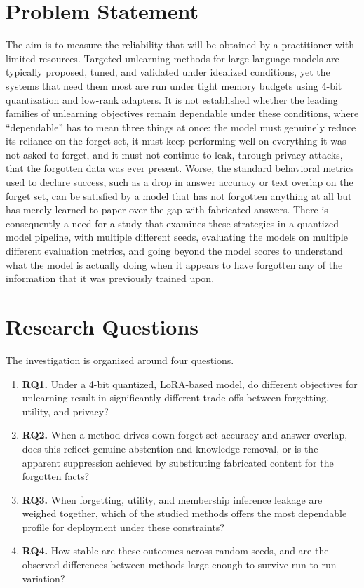 \documentclass[a4paper,12pt]{report}
\begin{document}
\section{Problem Statement}
The aim is to measure the reliability that will be obtained by a practitioner with limited resources. Targeted unlearning methods for large language models are typically proposed, tuned, and validated under idealized conditions, yet the systems that need them most are run under tight memory budgets using 4-bit quantization and low-rank adapters. It is not established whether the leading families of unlearning objectives remain dependable under these conditions, where ``dependable'' has to mean three things at once: the model must genuinely reduce its reliance on the forget set, it must keep performing well on everything it was not asked to forget, and it must not continue to leak, through privacy attacks, that the forgotten data was ever present. Worse, the standard behavioral metrics used to declare success, such as a drop in answer accuracy or text overlap on the forget set, can be satisfied by a model that has not forgotten anything at all but has merely learned to paper over the gap with fabricated answers. There is consequently a need for a study that examines these strategies in a quantized model pipeline, with multiple different seeds, evaluating the models on multiple different evaluation metrics, and going beyond the model scores to understand what the model is actually doing when it appears to have forgotten any of the information that it was previously trained upon.

\section{Research Questions}
The investigation is organized around four questions.

\begin{enumerate}
	\item \textbf{RQ1.} Under a 4-bit quantized, LoRA-based model, do different objectives for unlearning result in significantly different trade-offs between forgetting, utility, and privacy?
	\item \textbf{RQ2.} When a method drives down forget-set accuracy and answer overlap, does this reflect genuine abstention and knowledge removal, or is the apparent suppression achieved by substituting fabricated content for the forgotten facts?
	\item \textbf{RQ3.} When forgetting, utility, and membership inference leakage are weighed together, which of the studied methods offers the most dependable profile for deployment under these constraints?
	\item \textbf{RQ4.} How stable are these outcomes across random seeds, and are the observed differences between methods large enough to survive run-to-run variation?
\end{enumerate}
\end{document}
